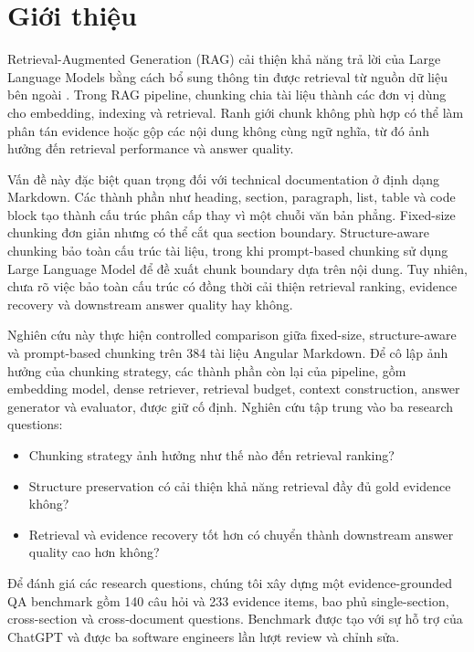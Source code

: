 \section{Giới thiệu}
\label{sec:introduction}

Retrieval-Augmented Generation (RAG) cải thiện khả năng trả lời của Large Language Models bằng cách bổ sung thông tin được retrieval từ nguồn dữ liệu bên ngoài \citep{lewis2020retrieval}. Trong RAG pipeline, chunking chia tài liệu thành các đơn vị dùng cho embedding, indexing và retrieval. Ranh giới chunk không phù hợp có thể làm phân tán evidence hoặc gộp các nội dung không cùng ngữ nghĩa, từ đó ảnh hưởng đến retrieval performance và answer quality.

Vấn đề này đặc biệt quan trọng đối với technical documentation ở định dạng Markdown. Các thành phần như heading, section, paragraph, list, table và code block tạo thành cấu trúc phân cấp thay vì một chuỗi văn bản phẳng. Fixed-size chunking đơn giản nhưng có thể cắt qua section boundary. Structure-aware chunking bảo toàn cấu trúc tài liệu, trong khi prompt-based chunking sử dụng Large Language Model để đề xuất chunk boundary dựa trên nội dung. Tuy nhiên, chưa rõ việc bảo toàn cấu trúc có đồng thời cải thiện retrieval ranking, evidence recovery và downstream answer quality hay không.

Nghiên cứu này thực hiện controlled comparison giữa fixed-size, structure-aware và prompt-based chunking trên 384 tài liệu Angular Markdown. Để cô lập ảnh hưởng của chunking strategy, các thành phần còn lại của pipeline, gồm embedding model, dense retriever, retrieval budget, context construction, answer generator và evaluator, được giữ cố định. Nghiên cứu tập trung vào ba research questions:

\begin{itemize}
    \item[\textbf{RQ1.}] Chunking strategy ảnh hưởng như thế nào đến retrieval ranking?
    
    \item[\textbf{RQ2.}] Structure preservation có cải thiện khả năng retrieval đầy đủ gold evidence không?
    
    \item[\textbf{RQ3.}] Retrieval và evidence recovery tốt hơn có chuyển thành downstream answer quality cao hơn không?
\end{itemize}

Để đánh giá các research questions, chúng tôi xây dựng một evidence-grounded QA benchmark gồm 140 câu hỏi và 233 evidence items, bao phủ single-section, cross-section và cross-document questions. Benchmark được tạo với sự hỗ trợ của ChatGPT và được ba software engineers lần lượt review và chỉnh sửa.

